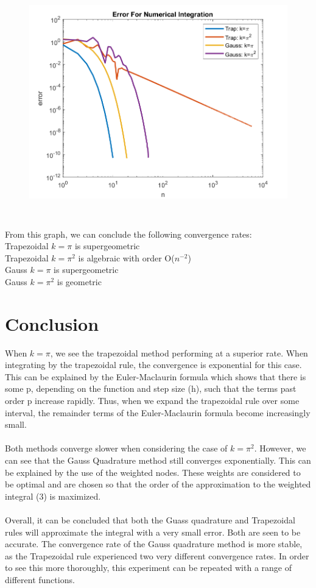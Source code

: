 \documentclass[12pt]{article}
\begin{document}
\begin{figure}[h!]
	
	\centering
	
		\includegraphics[width=\linewidth,height=100mm]{HW3_plot.png}	

	\end{figure}

From this graph, we can conclude the following convergence rates:
\\Trapezoidal $k = \pi$ is supergeometric
\\ Trapezoidal $k = \pi^2$ is algebraic
with order O($n^{-2}$)\\ Gauss $k = \pi$ is supergeometric
\\ Gauss $k = \pi^2$ is geometric
	
\pagebreak
	
	\section{Conclusion}
When $k = \pi$, we see the trapezoidal method performing at a superior rate. When integrating by the trapezoidal rule, the convergence is exponential for this case. This can be explained by the Euler-Maclaurin formula which shows that there is some p, depending on the function and step size (h), such that the terms past order p increase rapidly. Thus, when we expand the trapezoidal rule over some interval, the remainder terms of the Euler-Maclaurin formula become increasingly small. \\\\Both methods converge slower when considering the case of $k = \pi^2$. However, we can see that the Gauss Quadrature method still converges exponentially. This can be explained by the use of the weighted nodes. These weights are considered to be optimal and are chosen so that the order of the approximation to the weighted integral (3) is maximized. \\\\Overall, it can be concluded that both the Guass quadrature and Trapezoidal rules will approximate the integral with a very small error. Both are seen to be accurate. The convergence rate of the Gauss quadrature method is more stable, as the Trapezoidal rule experienced two very different convergence rates. In order to see this more thoroughly, this experiment can be repeated with a range of different functions.	
\end{document}
